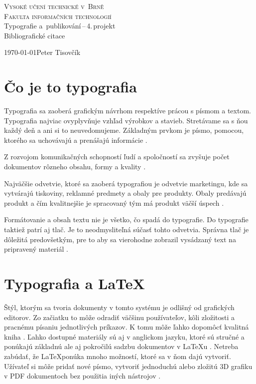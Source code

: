 \documentclass[11pt, a4paper, titlepage] {article}
\begin{document}
\begin{titlepage}
\begin{center}
	{\LARGE\textsc{Vysoké učení technické v~Brně}}\\
\medskip
{\Large\textsc{Fakulta informačních technologií}}\\
{\LARGE Typografie a~publikování\,--\,4.\,projekt}\\
\medskip
{\Huge Bibliografické citace}\\
\end{center}
{\Large \today \hfill Peter Tisovčík}
\end{titlepage}

\section{Čo je to typografia}
Typografia sa zaoberá grafickým návrhom respektíve prácou s písmom a textom. Typografia najviac ovyplyvňuje vzhľad výrobkov a stavieb. Stretávame sa s ňou každý deň a ani si to neuvedomujeme. Základným prvkom je písmo, pomocou, ktorého sa uchovávajú a prenášajú informácie \cite{Sirutek:Pravidla}.

Z rozvojom komunikačných schopností ľudí a spoločností sa zvyšuje počet dokumentov rôzneho obsahu, formy a kvality \cite{Bedrichova:vyuzitie}.

Najväčšie odvetvie, ktoré sa zaoberá typografiou je odvetvie marketingu, kde sa vytvárajú tiskoviny, reklamné predmety a obaly pre produkty. Obaly predávajú produkt a čím kvalitnejšie je spracovaný tým má produkt väčší úspech \cite{Typografia:Forma}.

Formátovanie a obsah textu nie je všetko, čo spadá do typografie. Do typografie taktiež patrí aj tlač. Je to neodmysliteľná súčasť tohto odvetvia. Správna tlač je dôležitá predovšetkým, pre to aby sa vierohodne zobrazil vysádzaný text na pripravený materiál \cite{Typografia:Tlac}.

\section{Typografia a \LaTeX }
Štýl, ktorým sa tvoria dokumenty v tomto systému je odlišný od grafických editorov. Zo začiatku to môže odradiť väčšinu používateľov, kôli zložitosti a pracnému písaniu jednotlivých príkazov. K tomu môže ľahko dopomôcť kvalitná kniha \cite{Rybicka:Latex}. Ľahko dostupné materiály sú aj v anglickom jazyku, ktoré sú stručné a ponúkajú základnú ale aj pokročilú sadzbu dokumentov v \LaTeX u \cite{Wikipedia:Latex} \cite{Kopka:Latech}. Netreba zabúdať, že \LaTeX  ponúka mnoho možností, ktoré sa v ňom dajú vytvoriť. Užívateľ si môže pridať nové písmo, vytvoriť jednoduchú alebo zložitú 3D grafiku v PDF dokumentoch bez použitia iných nástrojov \cite{Wagner:Zpravodaj}.
\end{document}
